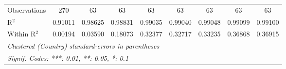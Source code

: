 \begin{table}[htbp]
\begin{tabular}{lcccccccc}
      Observations                                                          & 270      & 63       & 63             & 63              & 63              & 63              & 63                    & 63\\  
      R$^2$                                                                 & 0.91011  & 0.98625  & 0.98831        & 0.99035         & 0.99040         & 0.99048         & 0.99099               & 0.99100\\  
      Within R$^2$                                                          & 0.00194  & 0.03590  & 0.18073        & 0.32377         & 0.32717         & 0.33235         & 0.36868               & 0.36915\\  
      \midrule \midrule
      \multicolumn{9}{l}{\emph{Clustered (Country) standard-errors in parentheses}}\\
      \multicolumn{9}{l}{\emph{Signif. Codes: ***: 0.01, **: 0.05, *: 0.1}}\\
   \end{tabular}
\end{table}



